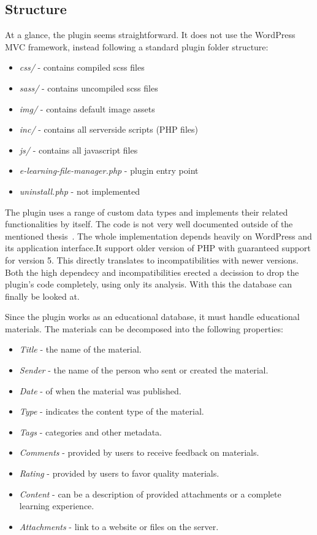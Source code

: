 \documentclass[
  digital,     %
  oneside,     %
  nosansbold,  %
  colorbold, %
  lof,         %
  lot,         %
]{fithesis4}
\begin{document}
\subsection{Structure}
\label{subsect:plugin-structure}

At a glance, the plugin seems straightforward. It does not use the WordPress MVC framework, instead following a standard  plugin folder structure: \begin{itemize}
	\item \textit{css/} - contains compiled scss files
	\item \textit{sass/} - contains uncompiled scss files
	\item \textit{img/} - contains default image assets
	\item \textit{inc/} - contains all serverside scripts (PHP files)
	\item \textit{js/} - contains all javascript files
	\item \textit{e-learning-file-manager.php} - plugin entry point
	\item \textit{uninstall.php} - not implemented
\end{itemize}

The plugin uses a range of custom data types and implements their related functionalities by itself. The code is not very well documented outside of the mentioned thesis~\cite{lang18}. The whole implementation depends heavily on WordPress and its application interface.It support older version of PHP with guaranteed support for version 5. This directly translates to incompatibilities with newer versions.  Both the high dependecy and incompatibilities erected a decission to drop the plugin's code completely, using only its analysis. With this the database can finally be looked at.

Since the plugin works as an educational database, it must handle educational materials. The materials can be decomposed into the following properties: \begin{itemize}
	\item \textit{Title} - the name of the material.
	\item \textit{Sender} - the name of the person who sent or created the material.
	\item \textit{Date} - of when the material was published.
	\item \textit{Type} - indicates the content type of the material.
	\item \textit{Tags} - categories and other metadata.
	\item \textit{Comments} - provided by users to receive feedback on materials.
	\item \textit{Rating} - provided by users to favor quality materials.
	\item \textit{Content} - can be a description of provided attachments or a complete learning experience.
	\item \textit{Attachments} - link to a website or files on the server.
\end{itemize}
\end{document}
